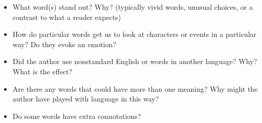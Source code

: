 \documentclass[a4paper,landscape,headrule,footrule,xetex]{foils}
\begin{document}

\begin{itemize}
\item What word(s) stand out? Why? (typically vivid words, unusual choices, or a contrast to what a reader expects)
\item How do particular words get us to look at characters or events in a particular way? Do they evoke an emotion?
\item Did the author use nonstandard English or words in another language? Why? What is the effect?
\item Are there any words that could have more than one meaning? Why might the author have played with language in this way?
\item Do some words have extra connotations?
\end{itemize}

\end{document}
